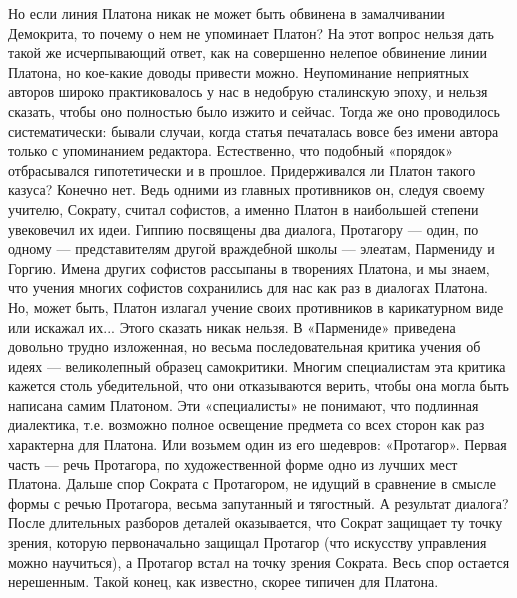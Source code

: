 Но если линия Платона никак не может быть обвинена в замалчивании
Демокрита, то почему о нем не упоминает Платон? На этот вопрос нельзя
дать такой же исчерпывающий ответ, как на совершенно нелепое обвинение
линии Платона, но кое-какие доводы привести можно. Неупоминание
неприятных авторов широко практиковалось у нас в недобрую сталинскую
эпоху, и нельзя сказать, чтобы оно полностью было изжито и сейчас.
Тогда же оно проводилось систематически: бывали случаи, когда статья
печаталась вовсе без имени автора только с упоминанием редактора.
Естественно, что подобный «порядок» отбрасывался гипотетически и в
прошлое. Придерживался ли Платон такого казуса? Конечно нет. Ведь
одними из главных противников он, следуя своему учителю, Сократу,
считал софистов, а именно Платон в наибольшей степени увековечил их
идеи. Гиппию посвящены два диалога, Протагору --- один, по одному ---
представителям другой враждебной школы --- элеатам, Пармениду и
Горгию. Имена других софистов рассыпаны в творениях Платона, и мы
знаем, что учения многих софистов сохранились для нас как раз в
диалогах Платона. Но, может быть, Платон излагал учение своих
противников в карикатурном виде или искажал их... Этого сказать никак
нельзя. В «Пармениде» приведена довольно трудно изложенная, но весьма
последовательная критика учения об идеях --- великолепный образец
самокритики. Многим специалистам эта критика кажется столь
убедительной, что они отказываются верить, чтобы она могла быть
написана самим Платоном. Эти «специалисты» не понимают, что подлинная
диалектика, т.е. возможно полное освещение предмета со всех сторон
как раз характерна для Платона. Или возьмем один из его шедевров:
«Протагор». Первая часть --- речь Протагора, по художественной форме
одно из лучших мест Платона. Дальше спор Сократа с Протагором, не
идущий в сравнение в смысле формы с речью Протагора, весьма запутанный
и тягостный. А результат диалога? После длительных разборов деталей
оказывается, что Сократ защищает ту точку зрения, которую
первоначально защищал Протагор (что искусству управления можно
научиться), а Протагор встал на точку зрения Сократа. Весь спор
остается нерешенным. Такой конец, как известно, скорее типичен для
Платона.

